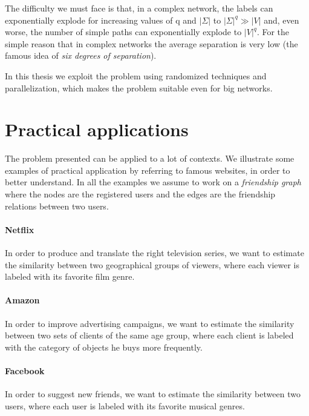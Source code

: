 The difficulty we must face is that, in a complex network, the labels can exponentially explode for increasing values of q and $|\Sigma|$ to $|\Sigma|^{q} \gg |V|$ and, even worse, the number of simple paths can exponentially explode to $|V|^{q}$. For the simple reason that in complex networks the average separation is very low (the famous idea of \textit{six degrees of separation}).\medskip

In this thesis we exploit the problem using randomized techniques and parallelization, which makes the problem suitable even for big networks. 

\section{Practical applications}

The problem presented can be applied to a lot of contexts. 
We illustrate some examples of practical application by referring to famous websites,
in order to better understand.
In all the examples we assume to work on a \textit{friendship graph} where the nodes are the registered users and 
the edges are the friendship relations between two users.

\paragraph*{Netflix} In order to produce and translate the right television series, we want to estimate the similarity between two geographical groups of viewers, where each viewer is labeled with its favorite film genre.
  
\paragraph*{Amazon} In order to improve advertising campaigns, we want to estimate the similarity between two sets of clients of the same age group, where each client is labeled with the category of objects he buys more frequently.

\paragraph*{Facebook} In order to suggest new friends, we want to estimate the similarity between two users, where each user is labeled with its favorite musical genres.  

